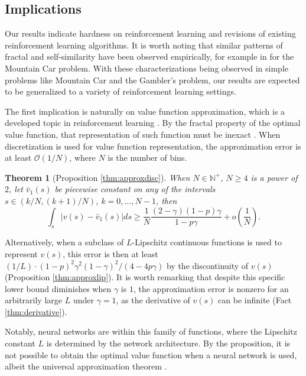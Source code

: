 \documentclass{article}
\theoremstyle{named}
\newtheorem*{namedtheorem}{Theorem}
\newcommand{\OO}{\mathcal{O}}
\begin{document}
\subsection{Implications} 

Our results indicate hardness on reinforcement learning \citep{papadimitriou1987complexity,littman1995complexity,thelen1998dynamic} and revisions of existing reinforcement learning algorithms. It is worth noting that similar patterns of fractal and self-similarity have been observed empirically, for example in \citet{chockalingam2019role} for the Mountain Car problem. With these characterizations being observed in simple problems like Mountain Car and the Gambler's problem, our results are expected to be generalized to a variety of reinforcement learning settings.

The first implication is naturally on value function approximation, which is a developed topic in reinforcement learning \citep{lee2008makes,lusena2001nonapproximability}. By the fractal property of the optimal value function, that representation of such function must be inexact \citep{tikhonov2014rate}. When discretization is used for value function representation, the approximation error is at least $\OO(1/N)$, where $N$ is the number of bins. 

\begin{namedtheorem}[Proposition \ref{thm:approxdisc}]
When $N\in \mathbb{N}^+$, $N\ge 4$ is a power of $2$, let $\bar v_1(s)$ be piecewise constant on any of the intervals $s\in (k/N, (k+1)/N)$, $k=0,\dots,N-1$, then
\[
\int_s \left| v(s)-\bar v_1(s) \right| ds \geq \frac{1}{N}\frac{(2-\gamma)(1-p)\gamma}{1-p\gamma} + o(\frac{1}{N}).
\]
\end{namedtheorem}
Alternatively, when a subclass of $L$-Lipschitz continuous functions is used to represent $v(s)$, this error is then at least $(1/L)\cdot (1-p)^2\gamma^2(1-\gamma)^2/(4-4p\gamma)$ by the discontinuity of $v(s)$ (Proposition \ref{thm:approxlip}). It is worth remarking that despite this specific lower bound diminishes when $\gamma$ is $1$, the approximation error is nonzero for an arbitrarily large $L$ under $\gamma=1$, as the derivative of $v(s)$ can be infinite (Fact \ref{thm:derivative}). 

Notably, neural networks are within this family of functions, where the Lipschitz constant $L$ is determined by the network architecture. By the proposition, it is not possible to obtain the optimal value function when a neural network is used, albeit the universal approximation theorem \citep{csaji2001approximation,dovgoshey2006cantor,levesley2007problem}.
\end{document}
